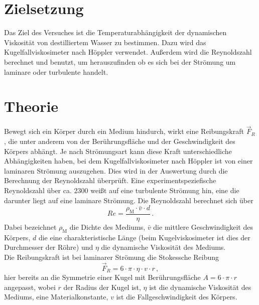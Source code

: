 \section{Zielsetzung}
\label{sec:Zielsetzung}
Das Ziel des Versuches ist die Temperaturabhängigkeit der dynamischen 
Viskosität von destilliertem Wasser zu bestimmen. Dazu wird das 
Kugelfallviskosimeter nach Höppler verwendet. Außerdem wird die Reynoldszahl 
berechnet und benutzt, um herauszufinden ob es sich bei der Strömung um 
laminare oder turbulente handelt. 
%
%
%
\section{Theorie}
    \label{sec:Theorie}
    Bewegt sich ein Körper durch ein Medium hindurch, wirkt eine Reibungskraft 
    $\vec{F}_{R}$, die unter anderem von der Berührungsfläche und der Geschwindigkeit
    des Körpers abhängt. Je nach Strömungsart kann diese Kraft 
    unterschiedliche Abhängigkeiten haben, bei dem Kugelfallviskosimeter nach 
    Höppler ist von einer laminaren Strömung auszugehen. 
    Dies wird in der Auswertung durch die
    Berechnung der Reynoldszahl überprüft. Eine experimentspeziefische 
    Reynoldszahl über ca. 2300 weißt auf eine turbulente Strömung hin, eine die
    darunter liegt auf eine laminare Strömung. Die Reynoldszahl berechnet sich
    über 
    \begin{equation}
        Re = \frac{\rho_{\text{M}} \cdot \bar{v} \cdot d}{\eta}\,. 
        \label{eqn:Reynoldszahl}
    \end{equation}
    Dabei bezeichnet $\rho_{\text{M}}$ die Dichte des Mediums, $\bar{v}$
    die mittlere Geschwindigkeit des Körpers, $d$ die eine charakteristische 
    Länge (beim Kugelviskosimeter ist dies der Durchmesser der Röhre)
    und $\eta$ die dynamische Viskosität des Mediums. \\
    Die Reibungskraft ist bei laminarer Strömung die Stokessche Reibung
    \begin{equation}
        \vec{F}_{R} = 6 \cdot \pi \cdot \eta \cdot v \cdot r \, , 
        \label{eqn:Stokesreibungskraft}
    \end{equation}
    hier bereits an die Symmetrie einer Kugel mit Berührungsfläche 
    $A = 6 \cdot \pi \cdot r$ angepasst, wobei $r$ der Radius der Kugel ist, 
    $\eta$ ist die dynamische Viskosität des Mediums, eine Materialkonstante,
    $v$ ist die Fallgeschwindigkeit des Körpers. \\
%
%
%
